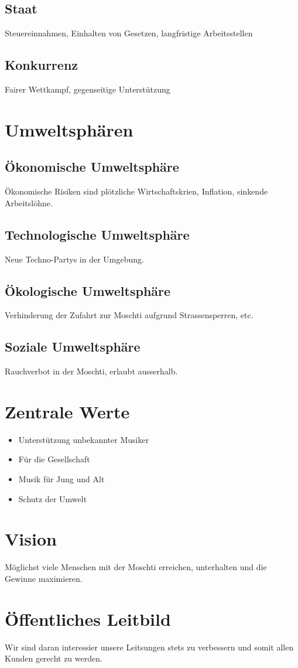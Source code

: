 \documentclass[a4paper, titlepage]{article}
\begin{document}
\subsection{Staat}
Steuereinnahmen, Einhalten von Gesetzen, langfristige Arbeitsstellen
\subsection{Konkurrenz}
Fairer Wettkampf, gegenseitige Unterstützung

\section{Umweltsphären}
\subsection{Ökonomische Umweltsphäre}
Ökonomische Risiken sind plötzliche Wirtschaftskrien, Inflation, sinkende Arbeitslöhne.
\subsection{Technologische Umweltsphäre}
Neue Techno-Partys in der Umgebung.
\subsection{Ökologische Umweltsphäre}
Verhinderung der Zufahrt zur Moschti aufgrund Strassensperren, etc.
\subsection{Soziale Umweltsphäre}
Rauchverbot in der Moschti, erlaubt ausserhalb. 
\section{Zentrale Werte}
\begin{itemize}
  \item Unterstützung unbekannter Musiker
  \item Für die Gesellschaft
  \item Musik für Jung und Alt
  \item Schutz der Umwelt
\end{itemize}
\section{Vision}
Möglichst viele Menschen mit der Moschti erreichen, unterhalten und die Gewinne maximieren. 
\section{Öffentliches Leitbild}
Wir sind daran interessier unsere Leitsungen stets zu verbessern und somit allen Kunden gerecht zu werden.
\end{document}
